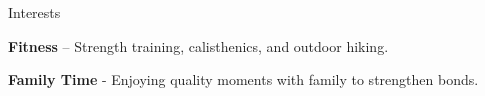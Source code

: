 \begin{rubric}{Interests}

\entry*{}%
 \textbf{Fitness}  
 – Strength training, calisthenics, and outdoor hiking. \par 
 
 \textbf{Family Time}  
- Enjoying quality moments with family to strengthen bonds.

\end{rubric}